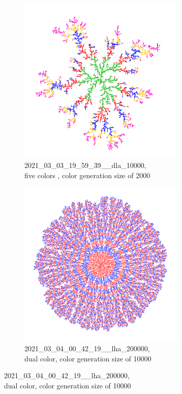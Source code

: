 \documentclass[12pt,a4paper]{scrartcl}
\newcommand{\1}{\mathbbm{1}}
\theoremstyle{definition}
\numberwithin{equation}{section}
\begin{document}
\begin{figure}[h!]
	\centering
	\begin{subfigure}[b]{.49\textwidth}
		\centerline{\includegraphics[height=8cm]{images/ia/2021_03_03_19_59_39___10000__2000__7448.png}}
		\captionsetup{labelformat=empty}
		\caption{2021\_03\_03\_19\_59\_39\_\_dla\_10000, \\five colors , color generation size of 2000}
	\end{subfigure}
	\begin{subfigure}[b]{.49\textwidth}
		\centerline{\includegraphics[height=8cm]{images/ia/2021_03_04_00_42_19___200000__10000__6945.png}}
		\captionsetup{labelformat=empty}
		\caption{2021\_03\_04\_00\_42\_19\_\_lha\_200000, \\dual color, color generation size of 10000}
	\end{subfigure}
\end{figure}
\end{document}
